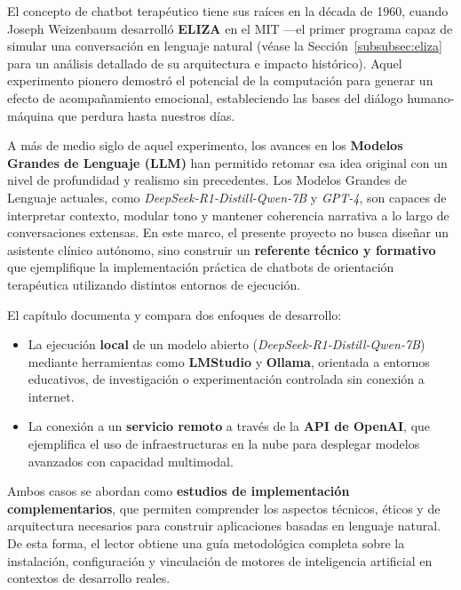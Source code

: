 \documentclass[12pt,a4paper]{report}
\numberwithin{figure}{section}
\begin{document}
El concepto de chatbot terapéutico tiene sus raíces en la década de 1960, cuando Joseph Weizenbaum desarrolló \textbf{ELIZA} en el MIT ---el primer programa capaz de simular una conversación en lenguaje natural (véase la Sección~\ref{subsubsec:eliza} para un análisis detallado de su arquitectura e impacto histórico). Aquel experimento pionero demostró el potencial de la computación para generar un efecto de acompañamiento emocional, estableciendo las bases del diálogo humano-máquina que perdura hasta nuestros días.

\vspace{1em}

A más de medio siglo de aquel experimento, los avances en los \textbf{Modelos Grandes de Lenguaje (LLM)} han permitido retomar esa idea original con un nivel de profundidad y realismo sin precedentes.  
Los Modelos Grandes de Lenguaje actuales, como \textit{DeepSeek-R1-Distill-Qwen-7B} y \textit{GPT-4}, son capaces de interpretar contexto, modular tono y mantener coherencia narrativa a lo largo de conversaciones extensas.  
En este marco, el presente proyecto no busca diseñar un asistente clínico autónomo, sino construir un \textbf{referente técnico y formativo} que ejemplifique la implementación práctica de chatbots de orientación terapéutica utilizando distintos entornos de ejecución.

\vspace{1em}

El capítulo documenta y compara dos enfoques de desarrollo:
\begin{itemize}
    \item La ejecución \textbf{local} de un modelo abierto (\textit{DeepSeek-R1-Distill-Qwen-7B}) mediante herramientas como \textbf{LMStudio} y \textbf{Ollama}, orientada a entornos educativos, de investigación o experimentación controlada sin conexión a internet.
    \item La conexión a un \textbf{servicio remoto} a través de la \textbf{API de OpenAI}, que ejemplifica el uso de infraestructuras en la nube para desplegar modelos avanzados con capacidad multimodal.
\end{itemize}

Ambos casos se abordan como \textbf{estudios de implementación complementarios}, que permiten comprender los aspectos técnicos, éticos y de arquitectura necesarios para construir aplicaciones basadas en lenguaje natural.  
De esta forma, el lector obtiene una guía metodológica completa sobre la instalación, configuración y vinculación de motores de inteligencia artificial en contextos de desarrollo reales.
\end{document}
